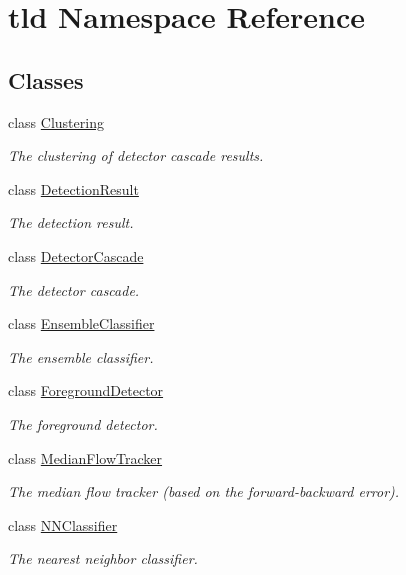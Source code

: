 \hypertarget{namespacetld}{\section{tld Namespace Reference}
\label{namespacetld}
}
\subsection*{Classes}
\begin{DoxyCompactItemize}
\item 
class \hyperlink{classtld_1_1Clustering}{Clustering}
\begin{DoxyCompactList}\small\item\em The clustering of detector cascade results. \end{DoxyCompactList}\item 
class \hyperlink{classtld_1_1DetectionResult}{Detection\-Result}
\begin{DoxyCompactList}\small\item\em The detection result. \end{DoxyCompactList}\item 
class \hyperlink{classtld_1_1DetectorCascade}{Detector\-Cascade}
\begin{DoxyCompactList}\small\item\em The detector cascade. \end{DoxyCompactList}\item 
class \hyperlink{classtld_1_1EnsembleClassifier}{Ensemble\-Classifier}
\begin{DoxyCompactList}\small\item\em The ensemble classifier. \end{DoxyCompactList}\item 
class \hyperlink{classtld_1_1ForegroundDetector}{Foreground\-Detector}
\begin{DoxyCompactList}\small\item\em The foreground detector. \end{DoxyCompactList}\item 
class \hyperlink{classtld_1_1MedianFlowTracker}{Median\-Flow\-Tracker}
\begin{DoxyCompactList}\small\item\em The median flow tracker (based on the forward-\/backward error). \end{DoxyCompactList}\item 
class \hyperlink{classtld_1_1NNClassifier}{N\-N\-Classifier}
\begin{DoxyCompactList}\small\item\em The nearest neighbor classifier. \end{DoxyCompactList}\item 

\end{DoxyCompactItemize}

